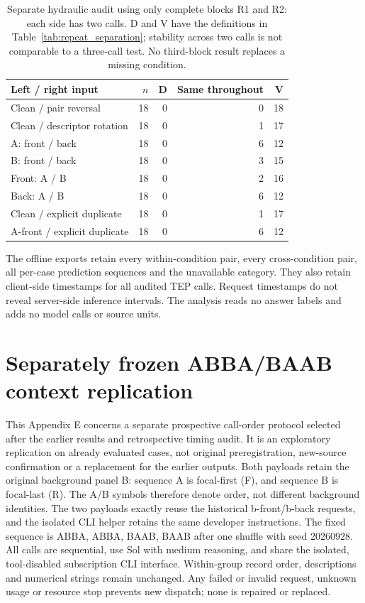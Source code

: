 \documentclass[11pt,a4paper]{article}
\begin{document}
\begin{table}[htbp]\centering\small
\caption{Separate hydraulic audit using only complete blocks R1 and R2: each side has two calls. D and V have the definitions in Table~\ref{tab:repeat_separation}; stability across two calls is not comparable to a three-call test. No third-block result replaces a missing condition.}
\label{tab:hydraulic_repeat_partition}
\begin{tabular}{@{}lrrrr@{}}\toprule
Left / right input & $n$ & D & Same throughout & V \\\midrule
Clean / pair reversal & 18 & 0 & 0 & 18 \\
Clean / descriptor rotation & 18 & 0 & 1 & 17 \\
A: front / back & 18 & 0 & 6 & 12 \\
B: front / back & 18 & 0 & 3 & 15 \\
Front: A / B & 18 & 0 & 2 & 16 \\
Back: A / B & 18 & 0 & 6 & 12 \\
Clean / explicit duplicate & 18 & 0 & 1 & 17 \\
A-front / explicit duplicate & 18 & 0 & 6 & 12 \\
\bottomrule\end{tabular}\end{table}

The offline exports retain every within-condition pair, every cross-condition pair, all per-case prediction sequences and the unavailable category. They also retain client-side timestamps for all audited TEP calls. Request timestamps do not reveal server-side inference intervals. The analysis reads no answer labels and adds no model calls or source units.
\FloatBarrier

\section{Separately frozen ABBA/BAAB context replication}
\label{app:context_blocked}
This Appendix E concerns a separate prospective call-order protocol selected after the earlier results and retrospective timing audit. It is an exploratory replication on already evaluated cases, not original preregistration, new-source confirmation or a replacement for the earlier outputs. Both payloads retain the original background panel B: sequence A is focal-first (F), and sequence B is focal-last (R). The A/B symbols therefore denote order, not different background identities. The two payloads exactly reuse the historical b-front/b-back requests, and the isolated CLI helper retains the same developer instructions. The fixed sequence is ABBA, ABBA, BAAB, BAAB after one shuffle with seed 20260928. All calls are sequential, use Sol with medium reasoning, and share the isolated, tool-disabled subscription CLI interface. Within-group record order, descriptions and numerical strings remain unchanged. Any failed or invalid request, unknown usage or resource stop prevents new dispatch; none is repaired or replaced.
\end{document}
